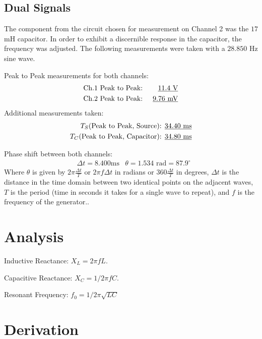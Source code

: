 \documentclass[twocolumn,english]{IEEEtran}
\theoremstyle{plain}
\theoremstyle{plain}
\begin{document}
\subsection{Dual Signals}
The component from the circuit chosen for measurement on Channel 2 was the $17$ mH capacitor. In order to exhibit a discernible response in the capacitor, the frequency was adjusted. The following measurements were taken with a $28.850$ Hz sine wave.

\noindent Peak to Peak measurements for both channels:
\begin{align*}
 &\text{Ch.1 Peak to Peak: }	&\text{\underline{$11.4$ V}}	\\
 &\text{Ch.2 Peak to Peak: }	&\text{\underline{$9.76$ mV}}
\end{align*}
\noindent Additional measurements taken:
\begin{align*}
 T_S \text{(Peak to Peak, Source): }	&\text{\underline{34.40 ms}} \\
 T_C \text{(Peak to Peak, Capacitor): }	&\text{\underline{34.80 ms}}
\end{align*}

\noindent Phase shift between both channels:
\begin{align*}
 &\Delta t = 8.400\text{ms}	&\theta = 1.534\text{ rad} = 87.9^{\circ}
\end{align*}
Where $\theta$ is given by  $2\pi\frac{\Delta t}{T}$ or $2\pi f \Delta t$ in radians or $360\frac{\Delta t}{T}$ in degrees, $\Delta t$ is the distance in the time domain between two identical points on the adjacent waves, $T$ is the period (time in seconds it takes for a single wave to repeat), and $f$ is the frequency of the generator..

\section{Analysis}
Inductive Reactance: $X_L = 2\pi f L$.

Capacitive Reactance: $X_C = 1/2\pi f C$.

Resonant Frequency: $f_0 = 1/2\pi\sqrt{LC}$
\appendices{}

\section{Derivation}\label{append:deriv}


%
%
\end{document}
